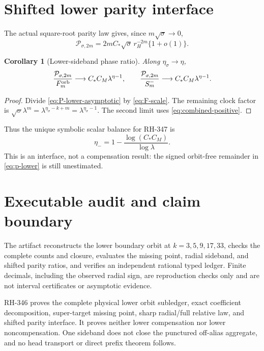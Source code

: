 \documentclass[11pt]{article}
\newtheorem{corollary}[theorem]{Corollary}
\theoremstyle{remark}
\newcommand{\cP}{\mathcal P}
\begin{document}
\section{Shifted lower parity interface}

The actual square-root parity law gives, since $m\sqrt\sigma\to0$,
\begin{equation}\label{eq:P-lower-asymptotic}
 \cP_{\sigma,2m}
 =2mC_*\sqrt\sigma\,r_H^{-2m}\{1+o(1)\}.
\end{equation}

\begin{corollary}[Lower-sideband phase ratio]
\label{cor:phase}
Along $\eta_\sigma\to\eta$,
\begin{equation}\label{eq:lower-phase}
 \frac{\cP_{\sigma,2m}}{F_m^{\rm orb}}
 \longrightarrow C_*C_M\lambda^{\eta-1},
 \qquad
 \frac{\cP_{\sigma,2m}}{S_m^-}
 \longrightarrow C_*C_M\lambda^{\eta-1}.
\end{equation}
\end{corollary}

\begin{proof}
Divide \eqref{eq:P-lower-asymptotic} by \eqref{eq:F-scale}.  The remaining
clock factor is
$\sqrt\sigma\lambda^m=\lambda^{\eta_\sigma-k+m}
=\lambda^{\eta_\sigma-1}$.  The second limit uses
\eqref{eq:combined-positive}.
\end{proof}

Thus the unique symbolic scalar balance for RH-347 is
\begin{equation}\label{eq:eta-minus}
 \eta_-=1-\frac{\log(C_*C_M)}{\log\lambda}.
\end{equation}
This is an interface, not a compensation result: the signed orbit-free
remainder in \eqref{eq:p-lower} is still unestimated.

\section{Executable audit and claim boundary}

The artifact reconstructs the lower boundary orbit at
$k=3,5,9,17,33$, checks the complete counts and closure, evaluates the
missing point, radial sideband, and shifted parity ratios, and verifies an
independent rational typed ledger.  Finite decimals, including the observed
radial sign, are reproduction checks only and are not interval certificates
or asymptotic evidence.

RH-346 proves the complete physical lower orbit subledger, exact coefficient
decomposition, super-target missing point, sharp radial/full relative law,
and shifted parity interface.  It proves neither lower compensation nor
lower noncompensation.  One sideband does not close the punctured off-alias
aggregate, and no head transport or direct prefix theorem follows.
\end{document}
